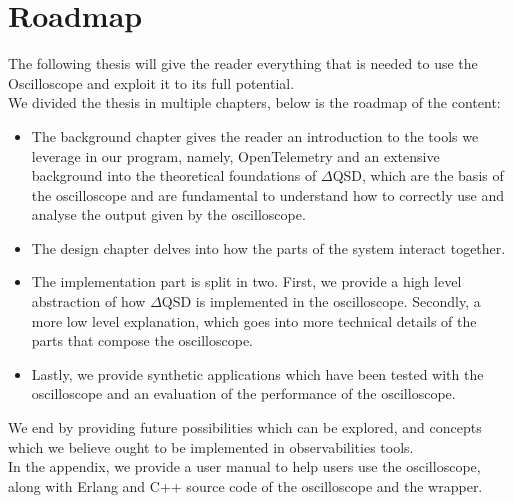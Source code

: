 \section{Roadmap}
    The following thesis will give the reader everything that is needed to use the Oscilloscope and exploit it to its full potential. \\
    We divided the thesis in multiple chapters, below is the roadmap of the content:
    \begin{itemize}
        \item The background chapter gives the reader an introduction to the tools we leverage in our program, namely, OpenTelemetry and an extensive background into the theoretical foundations of $\Delta$QSD, which are the basis of the oscilloscope and are fundamental to understand how to correctly use and analyse the output given by the oscilloscope.
        \item The design chapter delves into how the parts of the system interact together.
        \item The implementation part is split in two. First, we provide a high level abstraction of how $\Delta$QSD is implemented in the oscilloscope. Secondly, a more low level explanation, which goes into more technical details of the parts that compose the oscilloscope.
        \item Lastly, we provide synthetic applications which have been tested with the oscilloscope and an evaluation of the performance of the oscilloscope.

    \end{itemize}

    We end by providing future possibilities which can be explored, and concepts which we believe ought to be implemented in observabilities tools. \\
    In the appendix, we provide a user manual to help users use the oscilloscope, along with Erlang and C++ source code of the oscilloscope and the wrapper.
